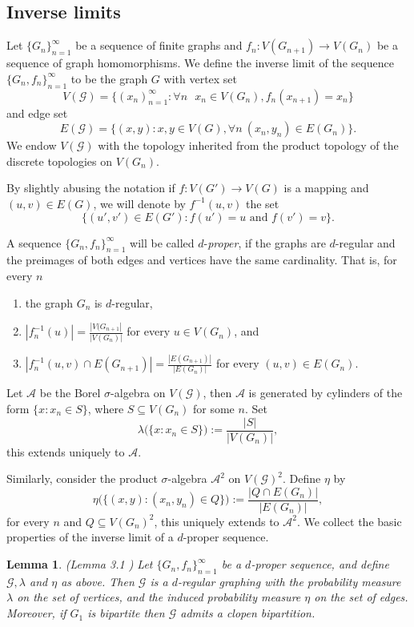 \documentclass[10pt]{article}
\theoremstyle{plain}
\newtheorem{lemma}{Lemma}[section]
\theoremstyle{remark}
\newcommand{\1}{\mathbbm{1}}
\numberwithin{equation}{section}
\begin{document}
\subsection{Inverse limits}

Let $\{ G_n \}_{n=1}^{\infty}$ be a sequence of finite graphs and $f_n:V(G_{n+1}) \rightarrow V(G_n)$ be a sequence of graph homomorphisms. We define the inverse limit of the sequence $\{ G_n ,f_n\}_{n=1}^{\infty}$ to be the graph $G$ with vertex set 
	\[ V(\mathcal{G})=\big\{ (x_n)_{n=1}^{\infty}:\forall n \text{ } x_n \in V(G_n), f_n (x_{n+1})=x_n  \big\}\]
	and edge set
	\[E(\mathcal{G})=\{ (x, y): x,y \in V(G), \forall n  \ (x_n, y_n) \in E(G_n) \}.\] 
	We endow $V(\mathcal{G})$ with the topology inherited from the product topology of the discrete topologies on $V(G_n)$.
	
	By slightly abusing the notation if $f:V(G') \to V(G)$ is a mapping and $(u,v) \in E(G)$, we will denote by $f^{-1}(u,v)$ the set \[\{(u',v') \in E(G'): f(u')=u \text{ and } f(v')=v\}.\]
	
	A sequence $\{ G_n,f_n \}_{n=1}^{\infty}$ will be called $d$-\emph{proper}, if the graphs are $d$-regular and the preimages of both edges and vertices have the same cardinality. That is, for every $n$
	\begin{enumerate}
		\item the graph $G_n$ is $d$-regular,
        \item $|f_n^{-1}(u)|=\frac{|V(G_{n+1}|}{|V(G_n)|}$ for every $u \in V(G_n)$, and
		\item $|f^{-1}_n(u,v) \cap E(G_{n+1})|=\frac{|E(G_{n+1})|}{|E(G_n)|}$ for every $(u,v) \in E(G_n)$.
	\end{enumerate}
	
    Let $\mathcal{A}$ be the Borel $\sigma$-algebra on $V(\mathcal{G})$, then $\mathcal{A}$ is generated by cylinders of the form $\{ x: x_n \in S \}$, where $S \subseteq V(G_n)$ for some $n$. Set
	\[\lambda\big(\{ x: 
	x_n \in S \}\big):=\frac{|S|}{|V(G_n)|},\]
    this extends uniquely to $\mathcal{A}$.
 
    Similarly, consider the product $\sigma$-algebra $\mathcal{A}^2$ on $V(\mathcal{G})^2$. Define $\eta$ by \\ \[\eta\Big(\{ (x, y): (x_n, y_n) \in Q \}\Big):=\frac{|Q \cap E(G_n)|}{|E(G_n)|},\] for every $n$ and $Q \subseteq V(G_n)^2$, this uniquely extends to 
	$\mathcal{A}^2$. We collect the basic properties of the inverse limit of a $d$-proper sequence.

\begin{lemma} \label{basic} (Lemma 3.1 \cite{kun2021measurable})
	Let $\{ G_n,f_n \}_{n=1}^{\infty}$ be a $d$-proper sequence, and define $\mathcal{G}, \lambda$ and $\eta$ as above.  
	Then $\mathcal{G}$ is a $d$-regular graphing with the probability measure $\lambda$ on the set of vertices, and the induced probability measure $\eta$ on the set of edges.  Moreover, if $G_1$ is bipartite then $\mathcal{G}$ admits a clopen bipartition.
\end{lemma}
\end{document}
